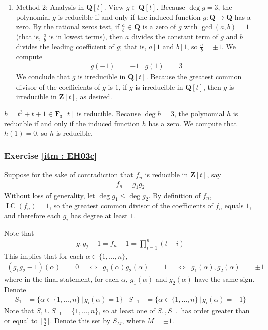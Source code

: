 \documentclass[oneside, english, 11pt]{article}
\newcommand{\divides}{\,|\,}
\newcommand{\F}{\mathbf{F}}
\newcommand{\integers}{\mathbf{Z}}
\DeclareMathOperator{\LC}{LC}
\newcommand{\Q}{\rationals}
\newcommand{\rationals}{\mathbf{Q}}
\newcommand{\st}{\, | \,}
\newcommand{\Z}{\integers}
\begin{document}
{\begin{enumerate}
\item Method 2: Analysis in $\Q[t]$. View $g \in \Q[t]$. Because $\deg g = 3$, the polynomial $g$ is reducible if and only if the induced function $g : \Q \rightarrow \Q$ has a zero. By the rational zeros test, if $\frac{a}{b} \in \Q$ is a zero of $g$ with $\gcd(a, b) = 1$ (that is, $\frac{a}{b}$ is in lowest terms), then $a$ divides the constant term of $g$ and $b$ divides the leading coefficient of $g$; that is, $a \divides 1$ and $b \divides 1$, so $\frac{a}{b} = \pm{}1$. We compute
\begin{align*}
g(-1)
&=
-1
&
g(1)
&=
3
\end{align*}
We conclude that $g$ is irreducible in $\Q[t]$. Because the greatest common divisor of the coefficients of $g$ is $1$, if $g$ is irreducible in $\Q[t]$, then $g$ is irreducible in $\Z[t]$, as desired.
\end{enumerate}

$h =  t^{3} + t + 1 \in \F_{3}[t]$ is reducible. Because $\deg h = 3$, the polynomial $h$ is reducible if and only if the induced function $h$ has a zero. We compute that $h(1) = 0$, so $h$ is reducible.



\subsubsection*{Exercise \ref{itm : EH03c}}


Suppose for the sake of contradiction that $f_{n}$ is reducible in $\Z[t]$, say
\begin{align*}
f_{n}
=
g_{1} g_{2}
\end{align*}
Without loss of generality, let $\deg g_{1} \leq \deg g_{2}$. By definition of $f_{n}$, $\LC(f_{n}) = 1$, so the greatest common divisor of the coefficients of $f_{n}$ equals $1$, and therefore each $g_{i}$ has degree at least $1$.

Note that
\begin{align*}
g_{1} g_{2} - 1
=
f_{n} - 1
=
\prod_{i = 1}^{n} (t - i)
\end{align*}
This implies that for each $\alpha \in \{1, \ldots, n\}$,
\begin{align*}
(g_{1} g_{2} - 1)(\alpha)
&=
0
&
&\Leftrightarrow
&
g_{1}(\alpha) g_{2}(\alpha)
&=
1
&
&\Leftrightarrow
&
g_{1}(\alpha), g_{2}(\alpha)
&=
\pm{}1
\end{align*}
where in the final statement, for each $\alpha$, $g_{1}(\alpha)$ and $g_{2}(\alpha)$ have the same sign. Denote
\begin{align*}
S_{1}
&=
\{\alpha \in \{1, \ldots, n\} \st g_{i}(\alpha) = 1\}
&
S_{-1}
&=
\{\alpha \in \{1, \ldots, n\} \st g_{i}(\alpha) = -1\}
\end{align*}
Note that $S_{1} \cup S_{-1} = \{1, \ldots, n\}$, so at least one of $S_{1}, S_{-1}$ has order greater than or equal to $\lceil{}\frac{n}{2}\rceil{}$. Denote this set by $S_{M}$, where $M = \pm{1}$.

}
\end{document}
